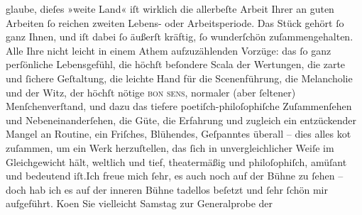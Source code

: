\begin{ledgroupsized}[t]{13cm}
               glaube, dieſes »weite Land« iſt wirklich die
               allerbeſte Arbeit Ihrer an guten Arbeiten ſo reichen zweiten Lebens- oder
               Arbeitsperiode.\pend
           \pstart
           Das Stück gehört ſo ganz Ihnen, und iſt dabei ſo äußerſt kräftig, ſo wunderſchön
               zuſammengehalten. Alle Ihre nicht leicht in einem Athem aufzuzählenden Vorzüge: das
               ſo ganz perſönliche Lebensgefühl, die höchſt beſondere Scala der Wertungen, {\pb}die zarte und ſichere Geſtaltung,
               die leichte Hand für die Scenenführung, die Melancholie und der Witz, der höchſt
               nötige \textsc{bon sens}, normaler (aber ſeltener) Menſchenverſtand,
               und dazu das tiefere poetiſch-philoſophiſche Zuſammenſehen und Nebeneinanderſehen,
               die Güte, die Erfahrung und zugleich ein entzückender Mangel an Routine, ein
               Friſches, Blühendes, Geſpanntes überall – dies alles ko{\geminationm}t zuſammen, um ein {\pb}Werk
               herzuſtellen, das ſich in unvergleichlicher Weiſe im Gleichgewicht hält, weltlich und
               tief, theatermäßig und philoſophiſch, amüſant und bedeutend iſt.\hspace*{1.5em}Ich freue mich ſehr, es auch noch auf der Bühne zu ſehen – doch hab
               ich es auf der inneren Bühne tadellos beſetzt und ſehr ſchön mir aufgeführt.\pend
           \pstart
           Ko{\geminationm}en Sie vielleicht Samstag zur
               Generalprobe der \label{K_L01968_2v}
\end{ledgroupsized}
